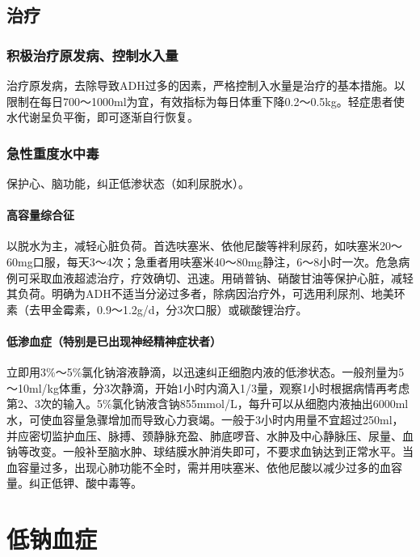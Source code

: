 \subsection{治疗}

\subsubsection{积极治疗原发病、控制水入量}

治疗原发病，去除导致ADH过多的因素，严格控制入水量是治疗的基本措施。以限制在每日700～1000ml为宜，有效指标为每日体重下降0.2～0.5kg。轻症患者使水代谢呈负平衡，即可逐渐自行恢复。

\subsubsection{急性重度水中毒}

保护心、脑功能，纠正低渗状态（如利尿脱水）。

\paragraph{高容量综合征}

以脱水为主，减轻心脏负荷。首选呋塞米、依他尼酸等袢利尿药，如呋塞米20～60mg口服，每天3～4次；急重者用呋塞米40～80mg静注，6～8小时一次。危急病例可采取血液超滤治疗，疗效确切、迅速。用硝普钠、硝酸甘油等保护心脏，减轻其负荷。明确为ADH不适当分泌过多者，除病因治疗外，可选用利尿剂、地美环素（去甲金霉素，0.9～1.2g/d，分3次口服）或碳酸锂治疗。

\paragraph{低渗血症（特别是已出现神经精神症状者）}

立即用3\%～5\%氯化钠溶液静滴，以迅速纠正细胞内液的低渗状态。一般剂量为5～10ml/kg体重，分3次静滴，开始1小时内滴入1/3量，观察1小时根据病情再考虑第2、3次的输入。5\%氯化钠液含钠855mmol/L，每升可以从细胞内液抽出6000ml水，可使血容量急骤增加而导致心力衰竭。一般于3小时内用量不宜超过250ml，并应密切监护血压、脉搏、颈静脉充盈、肺底啰音、水肿及中心静脉压、尿量、血钠等改变。一般补至脑水肿、球结膜水肿消失即可，不要求血钠达到正常水平。当血容量过多，出现心肺功能不全时，需并用呋塞米、依他尼酸以减少过多的血容量。纠正低钾、酸中毒等。

\protect\hypertarget{text00192.html}{}{}

\section{低钠血症}

